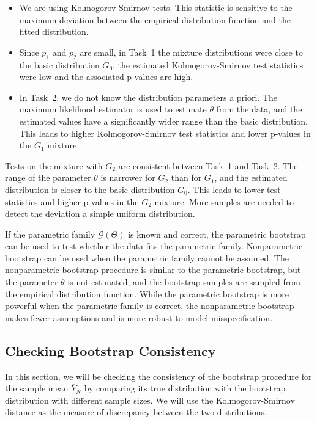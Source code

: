 \documentclass{article}
\begin{document}
\begin{itemize}
    \item We are using Kolmogorov-Smirnov tests. This statistic is sensitive to the maximum deviation between the empirical distribution function and the fitted distribution.
    \item Since \(p_1\) and \(p_2\) are small, in Task~1 the mixture distributions were close to the basic distribution \(G_0\), the estimated Kolmogorov-Smirnov test statistics were low and the associated p-values are high.
    \item In Task~2, we do not know the distribution parameters a priori. The maximum likelihood estimator is used to estimate \(\theta\) from the data, and the estimated values have a significantly wider range than the basic distribution. This leads to higher Kolmogorov-Smirnov test statistics and lower p-values in the \(G_1\) mixture.
\end{itemize}

Tests on the mixture with \(G_2\) are consistent between Task~1 and Task~2. The range of the parameter \(\theta\) is narrower for \(G_2\) than for \(G_1\), and the estimated distribution is closer to the basic distribution \(G_0\). This leads to lower test statistics and higher p-values in the \(G_2\) mixture. More samples are needed to detect the deviation a simple uniform distribution.

If the parametric family \(\mathcal{G}(\Theta)\) is known and correct, the parametric bootstrap can be used to test whether the data fits the parametric family. Nonparametric bootstrap can be used when the parametric family cannot be assumed. The nonparametric bootstrap procedure is similar to the parametric bootstrap, but the parameter \(\theta\) is not estimated, and the bootstrap samples are sampled from the empirical distribution function. While the parametric bootstrap is more powerful when the parametric family is correct, the nonparametric bootstrap makes fewer assumptions and is more robust to model misspecification.

\subsection{Checking Bootstrap Consistency}

In this section, we will be checking the consistency of the bootstrap procedure for the sample mean \(\overline{Y}_N\) by comparing its true distribution with the bootstrap distribution with different sample sizes. We will use the Kolmogorov-Smirnov distance as the measure of discrepancy between the two distributions.
\end{document}
